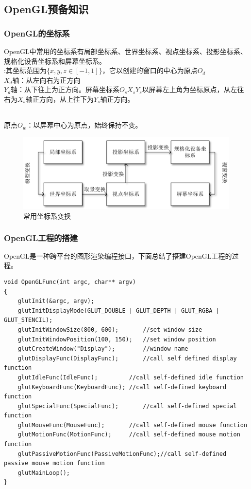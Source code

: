 \documentclass[10pt]{article}
\begin{document}
\subsection{OpenGL预备知识}
\subsubsection{OpenGL的坐标系}
OpenGL中常用的坐标系有局部坐标系、世界坐标系、视点坐标系、投影坐标系、规格化设备坐标系和屏幕坐标系。\\
:其坐标范围为$\{x,y,z \in [-1,1]\}$，它以创建的窗口的中心为原点$O_d$\\
$X_d$轴：从左向右为正方向\\
$Y_d$轴：从下往上为正方向。屏幕坐标系$O_sX_sY_s$以屏幕左上角为坐标原点，从左往右为$X_s$轴正方向，从上往下为$Y_s$轴正方向。\\
\\

原点$O_w$：以屏幕中心为原点，始终保持不变。


\begin{figure}[H]
\setlength{\abovecaptionskip}{2pt}
\setlength{\belowcaptionskip}{20pt}
\begin{center}
\includegraphics[scale=0.5]{coordinate.png}
\caption{常用坐标系变换}
\end{center}
\end{figure}


\subsubsection{OpenGL工程的搭建}
OpenGL是一种跨平台的图形渲染编程接口，下面总结了搭建OpenGL工程的过程。
\begin{lstlisting}
void OpenGLFunc(int argc, char** argv)
{
	glutInit(&argc, argv);
	glutInitDisplayMode(GLUT_DOUBLE | GLUT_DEPTH | GLUT_RGBA | GLUT_STENCIL);
	glutInitWindowSize(800, 600);		//set window size
	glutInitWindowPosition(100, 150);	//set window position
	glutCreateWindow("Display");		//window name
	glutDisplayFunc(DisplayFunc);		//call self defined display function
	glutIdleFunc(IdleFunc);			//call self-defined idle function
	glutKeyboardFunc(KeyboardFunc);	//call self-defined keyboard function
	glutSpecialFunc(SpecialFunc);		//call self-defined special function
	glutMouseFunc(MouseFunc);		//call self-defined mouse function
	glutMotionFunc(MotionFunc);		//call self-defined mouse motion function
	glutPassiveMotionFunc(PassiveMotionFunc);//call self-defined passive mouse motion function
	glutMainLoop();
}
\end{lstlisting}
\end{document}
